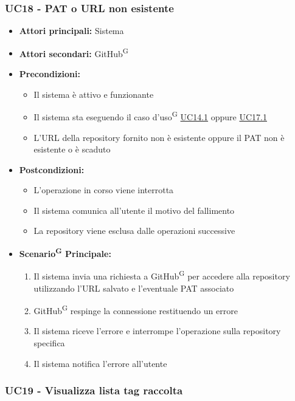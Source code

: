 \documentclass[a4paper, 11pt]{article}
\begin{document}
\subsubsection{UC18 - PAT o URL non esistente} \label{UC18}
\begin{itemize}
    \item \textbf{Attori principali:} Sistema
    \item \textbf{Attori secondari:} GitHub\textsuperscript{G}
    \item \textbf{Precondizioni:}
        \begin{itemize}
            \item Il sistema è attivo e funzionante
            \item Il sistema sta eseguendo il caso d'uso\textsuperscript{G} \hyperref[UC14.1]{UC14.1} oppure \hyperref[UC17.1]{UC17.1}
            \item L'URL della repository fornito non è esistente oppure il PAT non è esistente o è scaduto
        \end{itemize}
    \item \textbf{Postcondizioni:}
        \begin{itemize}
            \item L'operazione in corso viene interrotta
            \item Il sistema comunica all'utente il motivo del fallimento
            \item La repository viene esclusa dalle operazioni successive
        \end{itemize}
    \item \textbf{Scenario\textsuperscript{G} Principale:}
        \begin{enumerate}
            \item Il sistema invia una richiesta a GitHub\textsuperscript{G} per accedere alla repository utilizzando l'URL salvato e l'eventuale PAT associato
            \item GitHub\textsuperscript{G} respinge la connessione restituendo un errore
            \item Il sistema riceve l'errore e interrompe l'operazione sulla repository specifica
            \item Il sistema notifica l'errore all'utente
        \end{enumerate}
\end{itemize}


\subsubsection{UC19 - Visualizza lista tag raccolta} \label{UC19}
\end{document}
